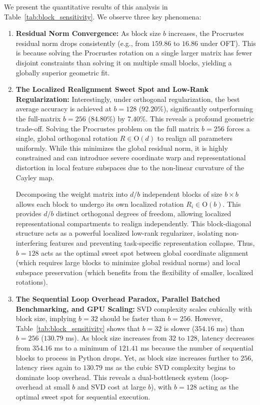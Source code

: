 We present the quantitative results of this analysis in Table~\ref{tab:block_sensitivity}. We observe three key phenomena:
\begin{enumerate}
    \item \textbf{Residual Norm Convergence:} As block size $b$ increases, the Procrustes residual norm drops consistently (e.g., from $159.86$ to $16.86$ under OFT). This is because solving the Procrustes rotation on a single larger matrix has fewer disjoint constraints than solving it on multiple small blocks, yielding a globally superior geometric fit.
    \item \textbf{The Localized Realignment Sweet Spot and Low-Rank Regularization:} Interestingly, under orthogonal regularization, the best average accuracy is achieved at $b = 128$ ($92.20\%$), significantly outperforming the full-matrix $b = 256$ ($84.80\%$) by $7.40\%$. This reveals a profound geometric trade-off. Solving the Procrustes problem on the full matrix $b=256$ forces a single, global orthogonal rotation $R \in \mathrm{O}(d)$ to realign all parameters uniformly. While this minimizes the global residual norm, it is highly constrained and can introduce severe coordinate warp and representational distortion in local feature subspaces due to the non-linear curvature of the Cayley map. 
    
    Decomposing the weight matrix into $d/b$ independent blocks of size $b \times b$ allows each block to undergo its own localized rotation $R_i \in \mathrm{O}(b)$. This provides $d/b$ distinct orthogonal degrees of freedom, allowing localized representational compartments to realign independently. This block-diagonal structure acts as a powerful localized low-rank regularizer, isolating non-interfering features and preventing task-specific representation collapse. Thus, $b=128$ acts as the optimal sweet spot between global coordinate alignment (which requires large blocks to minimize global residual norms) and local subspace preservation (which benefits from the flexibility of smaller, localized rotations).
    
    \item \textbf{The Sequential Loop Overhead Paradox, Parallel Batched Benchmarking, and GPU Scaling:} SVD complexity scales cubically with block size, implying $b=32$ should be faster than $b=256$. However, Table~\ref{tab:block_sensitivity} shows that $b=32$ is slower ($354.16$ ms) than $b=256$ ($130.79$ ms). As block size increases from $32$ to $128$, latency decreases from $354.16$ ms to a minimum of $121.41$ ms because the number of sequential blocks to process in Python drops. Yet, as block size increases further to $256$, latency rises again to $130.79$ ms as the cubic SVD complexity begins to dominate loop overhead. This reveals a dual-bottleneck system (loop-overhead at small $b$ and SVD cost at large $b$), with $b=128$ acting as the optimal sweet spot for sequential execution.
    

\end{enumerate}
